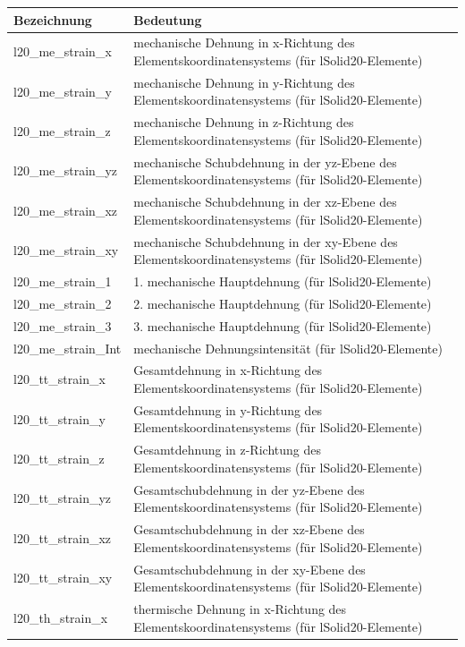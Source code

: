 \documentclass[11pt,titlepage,listof=totoc,bibliography=totoc,twoside]{scrreprt}
\begin{document}
{{\begin{tabularx}{\textwidth}{lX}
\toprule
Bezeichnung		& Bedeutung	\\
\midrule
l20\_me\_strain\_x	& mechanische Dehnung in x-Richtung des Elementskoordinatensystems (für lSolid20-Elemente) \\
l20\_me\_strain\_y	& mechanische Dehnung in y-Richtung des Elementskoordinatensystems (für lSolid20-Elemente) \\
l20\_me\_strain\_z	& mechanische Dehnung in z-Richtung des Elementskoordinatensystems (für lSolid20-Elemente) \\
l20\_me\_strain\_yz	& mechanische Schubdehnung in der yz-Ebene des Elementskoordinatensystems (für lSolid20-Elemente) \\
l20\_me\_strain\_xz	& mechanische Schubdehnung in der xz-Ebene des Elementskoordinatensystems (für lSolid20-Elemente) \\
l20\_me\_strain\_xy	& mechanische Schubdehnung in der xy-Ebene des Elementskoordinatensystems (für lSolid20-Elemente) \\
l20\_me\_strain\_1	& 1. mechanische Hauptdehnung (für lSolid20-Elemente) \\
l20\_me\_strain\_2	& 2. mechanische Hauptdehnung (für lSolid20-Elemente) \\
l20\_me\_strain\_3	& 3. mechanische Hauptdehnung (für lSolid20-Elemente) \\
l20\_me\_strain\_Int	& mechanische Dehnungsintensität (für lSolid20-Elemente) \\
l20\_tt\_strain\_x	& Gesamtdehnung in x-Richtung des Elementskoordinatensystems (für lSolid20-Elemente) \\
l20\_tt\_strain\_y	& Gesamtdehnung in y-Richtung des Elementskoordinatensystems (für lSolid20-Elemente) \\
l20\_tt\_strain\_z	& Gesamtdehnung in z-Richtung des Elementskoordinatensystems (für lSolid20-Elemente) \\
l20\_tt\_strain\_yz	& Gesamtschubdehnung in der yz-Ebene des Elementskoordinatensystems (für lSolid20-Elemente) \\
l20\_tt\_strain\_xz	& Gesamtschubdehnung in der xz-Ebene des Elementskoordinatensystems (für lSolid20-Elemente) \\
l20\_tt\_strain\_xy	& Gesamtschubdehnung in der xy-Ebene des Elementskoordinatensystems (für lSolid20-Elemente) \\
l20\_th\_strain\_x	& thermische Dehnung in x-Richtung des Elementskoordinatensystems (für lSolid20-Elemente) \\

\end{tabularx}}}
\end{document}
